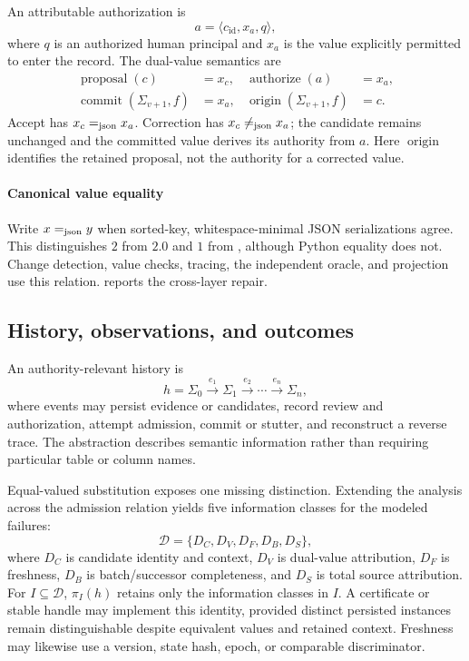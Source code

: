 An attributable authorization is
\begin{equation}
a=\langle c_{\mathrm{id}},x_a,q\rangle,
\label{eq:authorization}
\end{equation}
where $q$ is an authorized human principal and $x_a$ is the value explicitly permitted to enter the record. The dual-value semantics are
\begin{align}
\operatorname{proposal}(c)&=x_c, &
\operatorname{authorize}(a)&=x_a,\nonumber\\
\operatorname{commit}(\Sigma_{v+1},f)&=x_a, &
\operatorname{origin}(\Sigma_{v+1},f)&=c.
\label{eq:dual-value}
\end{align}
Accept has $x_c\mathrel{=_{\mathrm{json}}} x_a$. Correction has $x_c\mathrel{\neq_{\mathrm{json}}} x_a$; the candidate remains unchanged and the committed value derives its authority from $a$. Here $\operatorname{origin}$ identifies the retained proposal, not the authority for a corrected value.


\paragraph{Canonical value equality}
Write $x\mathrel{=_{\mathrm{json}}} y$ when sorted-key, whitespace-minimal JSON serializations agree. This distinguishes $2$ from $2.0$ and $1$ from , although Python equality does not. Change detection, value checks, tracing, the independent oracle, and projection use this relation.  reports the cross-layer repair.

\subsection{History, observations, and outcomes}

An authority-relevant history is
\begin{equation}
h=\Sigma_0\xrightarrow{e_1}\Sigma_1\xrightarrow{e_2}\cdots\xrightarrow{e_n}\Sigma_n,
\end{equation}
where events may persist evidence or candidates, record review and authorization, attempt admission, commit or stutter, and reconstruct a reverse trace. The abstraction describes semantic information rather than requiring particular table or column names.

Equal-valued substitution exposes one missing distinction. Extending the analysis across the admission relation yields five information classes for the modeled failures:
\begin{equation}
\mathcal D=\{D_C,D_V,D_F,D_B,D_S\},
\label{eq:distinction-basis}
\end{equation}
where $D_C$ is candidate identity and context, $D_V$ is dual-value attribution, $D_F$ is freshness, $D_B$ is batch/successor completeness, and $D_S$ is total source attribution. For $I\subseteq\mathcal D$, $\pi_I(h)$ retains only the information classes in $I$. A certificate or stable handle may implement this identity, provided distinct persisted instances remain distinguishable despite equivalent values and retained context. Freshness may likewise use a version, state hash, epoch, or comparable discriminator.

